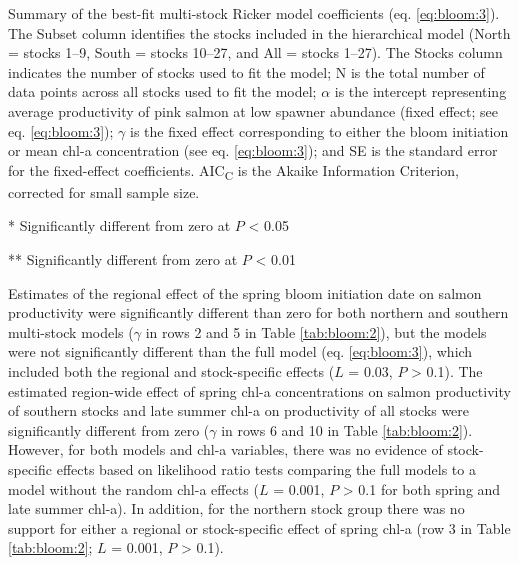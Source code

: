 \begin{table}[htbp]
  \small \centering \libertineLF
  \caption[Summary of the best-fit multi-stock Ricker model
           coefficients]{Summary of the best-fit multi-stock Ricker model
           coefficients (eq. \ref{eq:bloom:3}). The Subset column identifies the
           stocks included in the hierarchical model (North = stocks 1--9, South
           = stocks 10--27, and All = stocks 1--27). The Stocks column indicates
           the number of stocks used to fit the model; N is the total number of
           data points across all stocks used to fit the model; $\alpha$ is the
           intercept representing average productivity of pink salmon at low
           spawner abundance (fixed effect; see eq. \ref{eq:bloom:3}); $\gamma$
           is the fixed effect corresponding to either the bloom initiation or
           mean chl-a concentration (see eq. \ref{eq:bloom:3}); and SE is the
           standard error for the fixed-effect coefficients.
           AIC\textsubscript{C} is the Akaike Information Criterion, corrected
           for small sample size.}
  \begin{threeparttable}
    
    \begin{tablenotes}
      {\footnotesize
        \item[*] Significantly different from zero at $P$ \textless{} 0.05
        \item[**] Significantly different from zero at $P$ \textless{} 0.01
      }
    \end{tablenotes}
  \end{threeparttable}
  \label{tab:bloom:2}
\end{table}

Estimates of the regional effect of the spring bloom initiation date on salmon
productivity were significantly different than zero for both northern and
southern multi-stock models (\(\gamma\) in rows 2 and 5 in Table
\ref{tab:bloom:2}), but the models were not significantly different than the
full model (eq. \ref{eq:bloom:3}), which included both the regional and
stock-specific effects ($L$ = 0.03, $P$ \textgreater{} 0.1). The estimated
region-wide effect of spring chl-a concentrations on salmon productivity of
southern stocks and late summer chl-a on productivity of all stocks were
significantly different from zero (\(\gamma\) in rows 6 and 10 in Table
\ref{tab:bloom:2}). However, for both models and chl-a variables, there was no
evidence of stock-specific effects based on likelihood ratio tests comparing the
full models to a model without the random chl-a effects ($L$ = 0.001, $P$
\textgreater{} 0.1 for both spring and late summer chl-a). In addition, for the
northern stock group there was no support for either a regional or
stock-specific effect of spring chl-a (row 3 in Table \ref{tab:bloom:2}; $L$ =
0.001, $P$ \textgreater{} 0.1).


